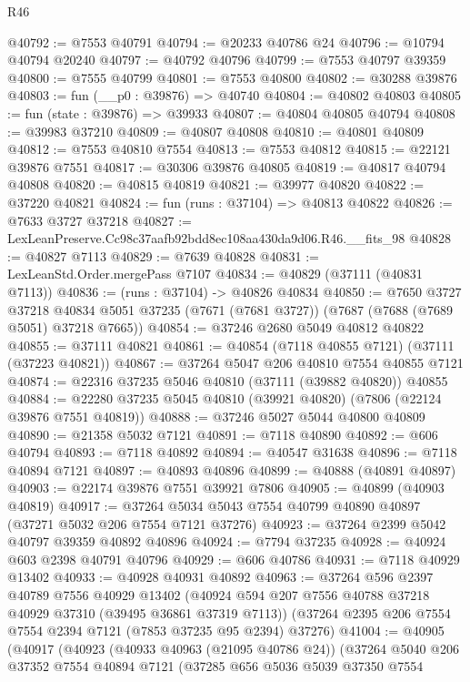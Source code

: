 \begin{lexlean}{R46}
\begin{coremodule}
@40792 := @7553 @40791
@40794 := @20233 @40786 @24
@40796 := @10794 @40794 @20240
@40797 := @40792 @40796
@40799 := @7553 @40797 @39359
@40800 := @7555 @40799
@40801 := @7553 @40800
@40802 := @30288 @39876
@40803 := fun (__p0 : @39876) => @40740
@40804 := @40802 @40803
@40805 := fun (state : @39876) => @39933
@40807 := @40804 @40805 @40794
@40808 := @39983 @37210
@40809 := @40807 @40808
@40810 := @40801 @40809
@40812 := @7553 @40810 @7554
@40813 := @7553 @40812
@40815 := @22121 @39876 @7551
@40817 := @30306 @39876 @40805
@40819 := @40817 @40794 @40808
@40820 := @40815 @40819
@40821 := @39977 @40820
@40822 := @37220 @40821
@40824 := fun (runs : @37104) => @40813 @40822
@40826 := @7633 @3727 @37218
@40827 := LexLeanPreserve.Cc98c37aafb92bdd8ec108aa430da9d06.R46.__fits_98
@40828 := @40827 @7113
@40829 := @7639 @40828
@40831 := LexLeanStd.Order.mergePass @7107
@40834 := @40829 (@37111 (@40831 @7113))
@40836 := (runs : @37104) -> @40826 @40834
@40850 := @7650
    @3727
    @37218
    @40834
    @5051
    @37235
    (@7671 (@7681 @3727))
    (@7687 (@7688 (@7689 @5051) @37218 @7665))
@40854 := @37246 @2680 @5049 @40812 @40822
@40855 := @37111 @40821
@40861 := @40854 (@7118 @40855 @7121) (@37111 (@37223 @40821))
@40867 := @37264 @5047 @206 @40810 @7554 @40855 @7121
@40874 := @22316 @37235 @5046 @40810 (@37111 (@39882 @40820)) @40855
@40884 := @22280 @37235 @5045 @40810 (@39921 @40820) (@7806 (@22124 @39876 @7551 @40819))
@40888 := @37246 @5027 @5044 @40800 @40809
@40890 := @21358 @5032 @7121
@40891 := @7118 @40890
@40892 := @606 @40794
@40893 := @7118 @40892
@40894 := @40547 @31638
@40896 := @7118 @40894 @7121
@40897 := @40893 @40896
@40899 := @40888 (@40891 @40897)
@40903 := @22174 @39876 @7551 @39921 @7806
@40905 := @40899 (@40903 @40819)
@40917 := @37264 @5034 @5043 @7554 @40799 @40890 @40897 (@37271 @5032 @206 @7554 @7121 @37276)
@40923 := @37264 @2399 @5042 @40797 @39359 @40892 @40896
@40924 := @7794 @37235
@40928 := @40924 @603 @2398 @40791 @40796
@40929 := @606 @40786
@40931 := @7118 @40929 @13402
@40933 := @40928 @40931 @40892
@40963 := @37264
    @596
    @2397
    @40789
    @7556
    @40929
    @13402
    (@40924 @594 @207 @7556 @40788 @37218 @40929 @37310 (@39495 @36861 @37319 @7113))
    (@37264 @2395 @206 @7554 @7554 @2394 @7121 (@7853 @37235 @95 @2394) @37276)
@41004 := @40905
    (@40917
      (@40923
        (@40933 @40963 (@21095 @40786 @24))
        (@37264
          @5040
          @206
          @37352
          @7554
          @40894
          @7121
          (@37285
            @656
            @5036
            @5039
            @37350
            @7554

\end{coremodule}
\end{lexlean}
